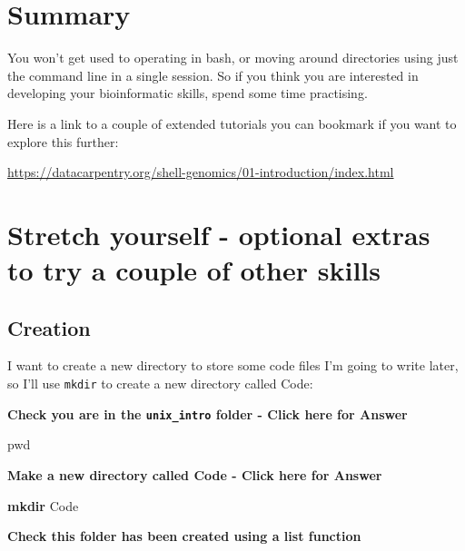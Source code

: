\documentclass[
]{book}
\newenvironment{Shaded}{\begin{snugshade}}{\end{snugshade}}
\newcommand{\BuiltInTok}[1]{#1}
\newcommand{\FunctionTok}[1]{\textcolor[rgb]{0.13,0.29,0.53}{\textbf{#1}}}
\newcommand{\NormalTok}[1]{#1}
\begin{document}
\hypertarget{summary-1}{%
\section{Summary}\label{summary-1}}

You won't get used to operating in bash, or moving around directories using just the command line in a single session. So if you think you are interested in developing your bioinformatic skills, spend some time practising.

Here is a link to a couple of extended tutorials you can bookmark if you want to explore this further:

\url{https://datacarpentry.org/shell-genomics/01-introduction/index.html}

\hypertarget{stretch-yourself---optional-extras-to-try-a-couple-of-other-skills}{%
\section{Stretch yourself - optional extras to try a couple of other skills}\label{stretch-yourself---optional-extras-to-try-a-couple-of-other-skills}}

\hypertarget{creation}{%
\subsection{Creation}\label{creation}}

I want to create a new directory to store some code files I'm going to write later, so I'll use \texttt{mkdir} to create a new directory called Code:

\textbf{Check you are in the \texttt{unix\_intro} folder - Click here for Answer}

\begin{Shaded}
\begin{Highlighting}[]
\BuiltInTok{pwd}
\end{Highlighting}
\end{Shaded}

\textbf{Make a new directory called Code - Click here for Answer}

\begin{Shaded}
\begin{Highlighting}[]
\FunctionTok{mkdir}\NormalTok{ Code}
\end{Highlighting}
\end{Shaded}

\textbf{Check this folder has been created using a list function}
\end{document}
